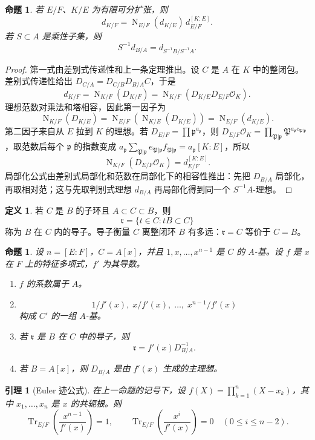 \documentclass[11pt,a4paper,openany]{ctexbook}
\numberwithin{equation}{chapter}
\newcommand{\Tr}{\operatorname{Tr}}
\newcommand{\Nm}{\operatorname{N}}
\theoremstyle{plain}
\newtheorem{proposition}[theorem]{命题}
\newtheorem{lemma}[theorem]{引理}
\theoremstyle{definition}
\newtheorem{definition}[theorem]{定义}
\theoremstyle{remark}
\begin{document}
\begin{proposition}
若 $E/F$、$K/E$ 为有限可分扩张，则
\[
d_{K/F}=\Nm_{E/F}(d_{K/E})\,d_{E/F}^{[K:E]}.
\]
若 $S\subset A$ 是乘性子集，则
\[
S^{-1}d_{B/A}=d_{S^{-1}B/S^{-1}A}.
\]
\end{proposition}

\begin{proof}
第一式由差别式传递性和上一条定理推出。设 $C$ 是 $A$ 在 $K$ 中的整闭包。差别式传递性给出
$D_{C/A}=D_{C/B}D_{B/A}C$，于是
\[
d_{K/F}
=\Nm_{K/F}(D_{K/F})
=\Nm_{K/F}(D_{K/E}D_{E/F}\mathcal O_K).
\]
理想范数对乘法和塔相容，因此第一因子为
\[
\Nm_{K/F}(D_{K/E})
=\Nm_{E/F}(\Nm_{K/E}(D_{K/E}))
=\Nm_{E/F}(d_{K/E}).
\]
第二因子来自从 $E$ 拉到 $K$ 的理想。若
$D_{E/F}=\prod\mathfrak p^{a_{\mathfrak p}}$，则
$D_{E/F}\mathcal O_K=\prod_{\mathfrak P|\mathfrak p}\mathfrak P^{a_{\mathfrak p}e_{\mathfrak P|\mathfrak p}}$，取范数后每个
$\mathfrak p$ 的指数变成
$a_{\mathfrak p}\sum_{\mathfrak P|\mathfrak p}e_{\mathfrak P|\mathfrak p}f_{\mathfrak P|\mathfrak p}
=a_{\mathfrak p}[K:E]$，所以
\[
\Nm_{K/F}(D_{E/F}\mathcal O_K)=d_{E/F}^{[K:E]}.
\]
局部化公式由差别式局部化和范数在局部化下的相容性推出：先把
$D_{B/A}$ 局部化，再取相对范；这与先取判别式理想 $d_{B/A}$ 再局部化得到同一个
$S^{-1}A$-理想。
\end{proof}

\begin{definition}
若 $C$ 是 $B$ 的子环且 $A\subset C\subset B$，则
\[
\mathfrak r=\{t\in C:tB\subset C\}
\]
称为 $B$ 在 $C$ 内的导子。导子衡量 $C$ 离整闭环 $B$ 有多远：$\mathfrak r=C$ 等价于 $C=B$。
\end{definition}

\begin{proposition}
设 $n=[E:F]$，$C=A[x]$，并且 $1,x,\dots,x^{n-1}$ 是 $C$ 的 $A$-基。设 $f$ 是 $x$ 在 $F$ 上的特征多项式，$f'$ 为其导数。
\begin{enumerate}[label=(\arabic*)]
\item $f$ 的系数属于 $A$。
\item
\[
1/f'(x),\;x/f'(x),\;\dots,\;x^{n-1}/f'(x)
\]
构成 $C'$ 的一组 $A$-基。
\item 若 $\mathfrak r$ 是 $B$ 在 $C$ 中的导子，则
\[
\mathfrak r=f'(x)D_{B/A}^{-1}.
\]
\item 若 $B=A[x]$，则 $D_{B/A}$ 是由 $f'(x)$ 生成的主理想。
\end{enumerate}
\end{proposition}

\begin{lemma}[Euler 迹公式]
在上一命题的记号下，设 $f(X)=\prod_{k=1}^n(X-x_k)$，其中 $x_1,\dots,x_n$ 是
$x$ 的共轭根。则
\[
\Tr_{E/F}\left(\frac{x^{n-1}}{f'(x)}\right)=1,\qquad
\Tr_{E/F}\left(\frac{x^i}{f'(x)}\right)=0\quad(0\le i\le n-2).
\]
\end{lemma}
\end{document}
